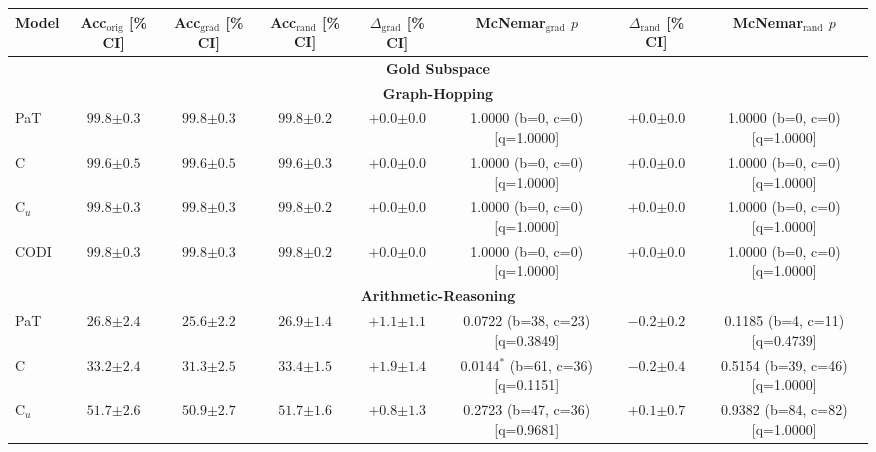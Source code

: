\begin{table}[h!]
\centering
\tiny
\setlength{\tabcolsep}{3pt}
\begin{tabular}{l ccc cc cc}
\toprule
Model & Acc$_{\text{orig}}$ [\% CI] & Acc$_{\text{grad}}$ [\% CI] & Acc$_{\text{rand}}$ [\% CI] & $\Delta_{\text{grad}}$ [\% CI] & McNemar$_{\text{grad}}$ $p$ & $\Delta_{\text{rand}}$ [\% CI] & McNemar$_{\text{rand}}$ $p$ \\
\midrule
\multicolumn{8}{c}{\textbf{Gold Subspace}} \\
\midrule
\multicolumn{8}{c}{\textbf{Graph-Hopping}} \\
\midrule
PaT & $99.8 {\scriptstyle \pm 0.3}$ & $99.8 {\scriptstyle \pm 0.3}$ & $99.8 {\scriptstyle \pm 0.2}$ & $+0.0 {\scriptstyle \pm 0.0}$ & 1.0000 (b=0, c=0) [q=1.0000] & $+0.0 {\scriptstyle \pm 0.0}$ & 1.0000 (b=0, c=0) [q=1.0000] \\
C & $99.6 {\scriptstyle \pm 0.5}$ & $99.6 {\scriptstyle \pm 0.5}$ & $99.6 {\scriptstyle \pm 0.3}$ & $+0.0 {\scriptstyle \pm 0.0}$ & 1.0000 (b=0, c=0) [q=1.0000] & $+0.0 {\scriptstyle \pm 0.0}$ & 1.0000 (b=0, c=0) [q=1.0000] \\
C$_u$ & $99.8 {\scriptstyle \pm 0.3}$ & $99.8 {\scriptstyle \pm 0.3}$ & $99.8 {\scriptstyle \pm 0.2}$ & $+0.0 {\scriptstyle \pm 0.0}$ & 1.0000 (b=0, c=0) [q=1.0000] & $+0.0 {\scriptstyle \pm 0.0}$ & 1.0000 (b=0, c=0) [q=1.0000] \\
CODI & $99.8 {\scriptstyle \pm 0.3}$ & $99.8 {\scriptstyle \pm 0.3}$ & $99.8 {\scriptstyle \pm 0.2}$ & $+0.0 {\scriptstyle \pm 0.0}$ & 1.0000 (b=0, c=0) [q=1.0000] & $+0.0 {\scriptstyle \pm 0.0}$ & 1.0000 (b=0, c=0) [q=1.0000] \\
\midrule
\multicolumn{8}{c}{\textbf{Arithmetic-Reasoning}} \\
\midrule
PaT & $26.8 {\scriptstyle \pm 2.4}$ & $25.6 {\scriptstyle \pm 2.2}$ & $26.9 {\scriptstyle \pm 1.4}$ & $+1.1 {\scriptstyle \pm 1.1}$ & 0.0722 (b=38, c=23) [q=0.3849] & $-0.2 {\scriptstyle \pm 0.2}$ & 0.1185 (b=4, c=11) [q=0.4739] \\
C & $33.2 {\scriptstyle \pm 2.4}$ & $31.3 {\scriptstyle \pm 2.5}$ & $33.4 {\scriptstyle \pm 1.5}$ & $+1.9 {\scriptstyle \pm 1.4}$ & 0.0144$^{*}$ (b=61, c=36) [q=0.1151] & $-0.2 {\scriptstyle \pm 0.4}$ & 0.5154 (b=39, c=46) [q=1.0000] \\
C$_u$ & $51.7 {\scriptstyle \pm 2.6}$ & $50.9 {\scriptstyle \pm 2.7}$ & $51.7 {\scriptstyle \pm 1.6}$ & $+0.8 {\scriptstyle \pm 1.3}$ & 0.2723 (b=47, c=36) [q=0.9681] & $+0.1 {\scriptstyle \pm 0.7}$ & 0.9382 (b=84, c=82) [q=1.0000] \\

\end{tabular}
\end{table}
